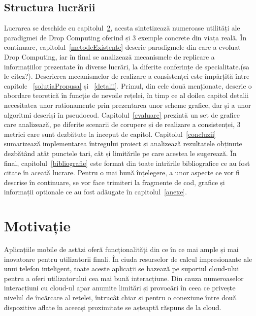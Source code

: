 \documentclass[12pt,a4paper]{report}
\begin{document}
\section{Structura lucrării}
Lucrarea se deschide cu capitolul~\ref{motivatie}, acesta sintetizează numeroase utilități ale paradigmei de Drop Computing oferind și 3 exemple concrete din viața reală. În continuare, capitolul~\ref{metodeExistente} descrie paradigmele din care a evoluat Drop Computing, iar în final se analizează mecanismele de replicare a informațiilor prezentate în diverse lucrări, la diferite conferințe de specialitate.(sa le citez?). Descrierea mecanismelor de realizare a consistenței este împărțită între capitole ~\ref{solutiaPropusa} și ~\ref{detalii}. Primul, din cele două menționate, descrie o abordare teoretică în funcție de nevoile rețelei, în timp ce al doilea capitol detalii necesitatea unor rationamente prin prezentarea unor scheme grafice, dar și a unor algoritmi descriși în pseudocod. Capitolul~\ref{evaluare} prezintă un set de grafice care analizează, pe diferite scenarii de corupere și de realizare a consistenței, 3 metrici care sunt dezbătute la inceput de capitol.
Capitolul~\ref{concluzii} sumarizează implementarea întregului proiect și analizează rezultatele obținute dezbătând atât punctele tari, cât și limitările pe care acestea le sugerează. În final, capitolul~\ref{bibliografie} este format din toate intrările bibliografice ce au fost citate în aceată lucrare. Pentru o mai bună înțelegere, a unor aspecte ce vor fi descrise în continuare, se vor face trimiteri la fragmente de cod, grafice și informații optionale ce au fost adăugate în capitolul~\ref{anexe}. 


\chapter{Motivație} \label{motivatie}

Aplicațiile mobile de astăzi oferă funcționalități din ce în ce mai ample și mai inovatoare pentru utilizatorii finali. În ciuda resurselor de calcul impresionante ale unui telefon inteligent, toate aceste aplicații se bazează pe suportul cloud-ului pentru a oferi utilizatorului cea mai bună interacțiune. Din cauza numeroaselor interacțiuni cu cloud-ul apar anumite limitări și provocări în ceea ce privește nivelul de încărcare al rețelei, întrucât chiar și pentru o conexiune între două dispozitive aflate în aceeași proximitate se așteaptă răspuns de la cloud.
\end{document}
